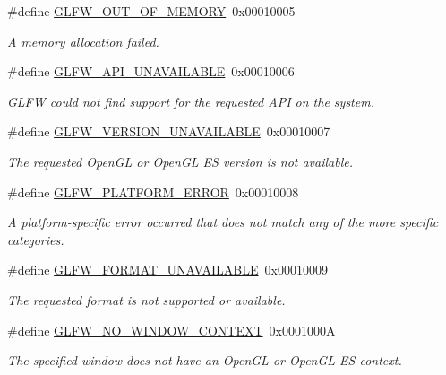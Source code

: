 \begin{DoxyCompactItemize}
\#define \hyperlink{group__errors_ga9023953a2bcb98c2906afd071d21ee7f}{G\+L\+F\+W\+\_\+\+O\+U\+T\+\_\+\+O\+F\+\_\+\+M\+E\+M\+O\+RY}~0x00010005
\begin{DoxyCompactList}\small\item\em A memory allocation failed. \end{DoxyCompactList}\item 
\#define \hyperlink{group__errors_ga56882b290db23261cc6c053c40c2d08e}{G\+L\+F\+W\+\_\+\+A\+P\+I\+\_\+\+U\+N\+A\+V\+A\+I\+L\+A\+B\+LE}~0x00010006
\begin{DoxyCompactList}\small\item\em G\+L\+FW could not find support for the requested A\+PI on the system. \end{DoxyCompactList}\item 
\#define \hyperlink{group__errors_gad16c5565b4a69f9c2a9ac2c0dbc89462}{G\+L\+F\+W\+\_\+\+V\+E\+R\+S\+I\+O\+N\+\_\+\+U\+N\+A\+V\+A\+I\+L\+A\+B\+LE}~0x00010007
\begin{DoxyCompactList}\small\item\em The requested Open\+GL or Open\+GL ES version is not available. \end{DoxyCompactList}\item 
\#define \hyperlink{group__errors_gad44162d78100ea5e87cdd38426b8c7a1}{G\+L\+F\+W\+\_\+\+P\+L\+A\+T\+F\+O\+R\+M\+\_\+\+E\+R\+R\+OR}~0x00010008
\begin{DoxyCompactList}\small\item\em A platform-\/specific error occurred that does not match any of the more specific categories. \end{DoxyCompactList}\item 
\#define \hyperlink{group__errors_ga196e125ef261d94184e2b55c05762f14}{G\+L\+F\+W\+\_\+\+F\+O\+R\+M\+A\+T\+\_\+\+U\+N\+A\+V\+A\+I\+L\+A\+B\+LE}~0x00010009
\begin{DoxyCompactList}\small\item\em The requested format is not supported or available. \end{DoxyCompactList}\item 
\#define \hyperlink{group__errors_gacff24d2757da752ae4c80bf452356487}{G\+L\+F\+W\+\_\+\+N\+O\+\_\+\+W\+I\+N\+D\+O\+W\+\_\+\+C\+O\+N\+T\+E\+XT}~0x0001000A
\begin{DoxyCompactList}\small\item\em The specified window does not have an Open\+GL or Open\+GL ES context. \end{DoxyCompactList}\end{DoxyCompactItemize}


